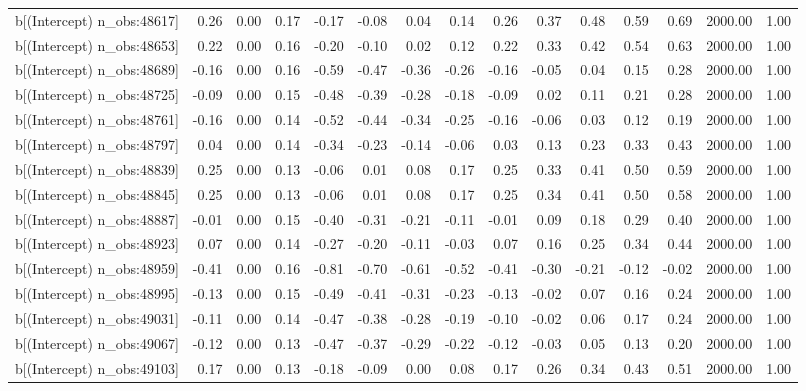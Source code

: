 \begin{table}[ht]
\begin{tabular}{rrrrrrrrrrrrrrr}
  b[(Intercept) n\_obs:48617] & 0.26 & 0.00 & 0.17 & -0.17 & -0.08 & 0.04 & 0.14 & 0.26 & 0.37 & 0.48 & 0.59 & 0.69 & 2000.00 & 1.00 \\ 
  b[(Intercept) n\_obs:48653] & 0.22 & 0.00 & 0.16 & -0.20 & -0.10 & 0.02 & 0.12 & 0.22 & 0.33 & 0.42 & 0.54 & 0.63 & 2000.00 & 1.00 \\ 
  b[(Intercept) n\_obs:48689] & -0.16 & 0.00 & 0.16 & -0.59 & -0.47 & -0.36 & -0.26 & -0.16 & -0.05 & 0.04 & 0.15 & 0.28 & 2000.00 & 1.00 \\ 
  b[(Intercept) n\_obs:48725] & -0.09 & 0.00 & 0.15 & -0.48 & -0.39 & -0.28 & -0.18 & -0.09 & 0.02 & 0.11 & 0.21 & 0.28 & 2000.00 & 1.00 \\ 
  b[(Intercept) n\_obs:48761] & -0.16 & 0.00 & 0.14 & -0.52 & -0.44 & -0.34 & -0.25 & -0.16 & -0.06 & 0.03 & 0.12 & 0.19 & 2000.00 & 1.00 \\ 
  b[(Intercept) n\_obs:48797] & 0.04 & 0.00 & 0.14 & -0.34 & -0.23 & -0.14 & -0.06 & 0.03 & 0.13 & 0.23 & 0.33 & 0.43 & 2000.00 & 1.00 \\ 
  b[(Intercept) n\_obs:48839] & 0.25 & 0.00 & 0.13 & -0.06 & 0.01 & 0.08 & 0.17 & 0.25 & 0.33 & 0.41 & 0.50 & 0.59 & 2000.00 & 1.00 \\ 
  b[(Intercept) n\_obs:48845] & 0.25 & 0.00 & 0.13 & -0.06 & 0.01 & 0.08 & 0.17 & 0.25 & 0.34 & 0.41 & 0.50 & 0.58 & 2000.00 & 1.00 \\ 
  b[(Intercept) n\_obs:48887] & -0.01 & 0.00 & 0.15 & -0.40 & -0.31 & -0.21 & -0.11 & -0.01 & 0.09 & 0.18 & 0.29 & 0.40 & 2000.00 & 1.00 \\ 
  b[(Intercept) n\_obs:48923] & 0.07 & 0.00 & 0.14 & -0.27 & -0.20 & -0.11 & -0.03 & 0.07 & 0.16 & 0.25 & 0.34 & 0.44 & 2000.00 & 1.00 \\ 
  b[(Intercept) n\_obs:48959] & -0.41 & 0.00 & 0.16 & -0.81 & -0.70 & -0.61 & -0.52 & -0.41 & -0.30 & -0.21 & -0.12 & -0.02 & 2000.00 & 1.00 \\ 
  b[(Intercept) n\_obs:48995] & -0.13 & 0.00 & 0.15 & -0.49 & -0.41 & -0.31 & -0.23 & -0.13 & -0.02 & 0.07 & 0.16 & 0.24 & 2000.00 & 1.00 \\ 
  b[(Intercept) n\_obs:49031] & -0.11 & 0.00 & 0.14 & -0.47 & -0.38 & -0.28 & -0.19 & -0.10 & -0.02 & 0.06 & 0.17 & 0.24 & 2000.00 & 1.00 \\ 
  b[(Intercept) n\_obs:49067] & -0.12 & 0.00 & 0.13 & -0.47 & -0.37 & -0.29 & -0.22 & -0.12 & -0.03 & 0.05 & 0.13 & 0.20 & 2000.00 & 1.00 \\ 
  b[(Intercept) n\_obs:49103] & 0.17 & 0.00 & 0.13 & -0.18 & -0.09 & 0.00 & 0.08 & 0.17 & 0.26 & 0.34 & 0.43 & 0.51 & 2000.00 & 1.00 \\ 

\end{tabular}
\end{table}
